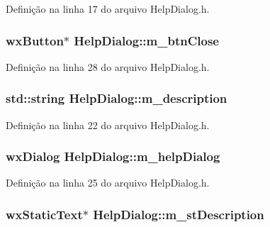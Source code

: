 Definição na linha 17 do arquivo Help\+Dialog.\+h.

\subsubsection[{m\+\_\+btn\+Close}]{\setlength{\rightskip}{0pt plus 5cm}wx\+Button$\ast$ Help\+Dialog\+::m\+\_\+btn\+Close\hspace{0.3cm}{\ttfamily [protected]}}\label{class_help_dialog_a69a51deec5b75b5566c43302b17426a2}


Definição na linha 28 do arquivo Help\+Dialog.\+h.

\subsubsection[{m\+\_\+description}]{\setlength{\rightskip}{0pt plus 5cm}std\+::string Help\+Dialog\+::m\+\_\+description\hspace{0.3cm}{\ttfamily [protected]}}\label{class_help_dialog_a42df2e3ecb28845603007446d46ec5fe}


Definição na linha 22 do arquivo Help\+Dialog.\+h.

\subsubsection[{m\+\_\+help\+Dialog}]{\setlength{\rightskip}{0pt plus 5cm}wx\+Dialog Help\+Dialog\+::m\+\_\+help\+Dialog\hspace{0.3cm}{\ttfamily [protected]}}\label{class_help_dialog_a6a137719a3f83fbab4e08a15b72217d9}


Definição na linha 25 do arquivo Help\+Dialog.\+h.

\subsubsection[{m\+\_\+st\+Description}]{\setlength{\rightskip}{0pt plus 5cm}wx\+Static\+Text$\ast$ Help\+Dialog\+::m\+\_\+st\+Description\hspace{0.3cm}{\ttfamily [protected]}}\label{class_help_dialog_a7a602b81e6e2c736b7a8f4a776529e17}


